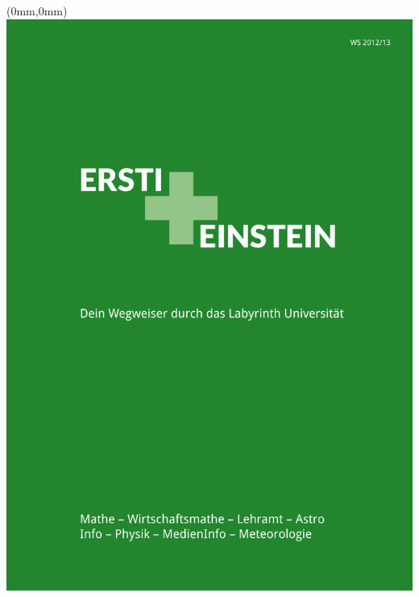 \documentclass[twoside,12pt,parskip=half-]{scrartcl}
\begin{document}




\renewenvironment{itemize}
{
    \begin{list}{$\circ$ \ }{}
        \setlength{\topsep}{0pt}
        \setlength{\parskip}{0pt}
        \setlength{\partopsep}{0pt}
        \setlength{\parsep}{0pt}         
        \setlength{\itemsep}{1pt} 
}
{
    \end{list} 
}







\begin{titlepage}
\thispagestyle{empty}
\begin{textblock*}{\paperwidth}(0mm,0mm)
   \noindent\includegraphics[width=\paperwidth,height=\paperheight]{titel}
\end{textblock*}
\mbox{}
\end{titlepage}
\end{document}
